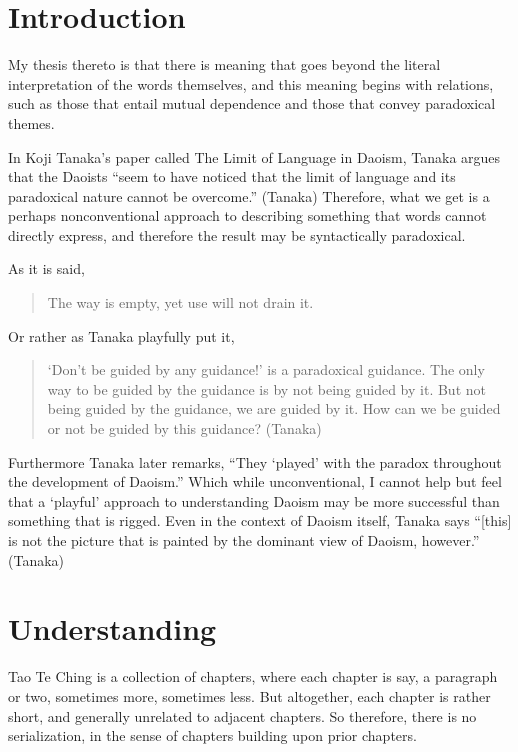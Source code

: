 \section{Introduction}

My thesis thereto is that there is meaning that goes beyond the literal interpretation of the words themselves, and this meaning begins with relations, such as those that entail mutual dependence and those that convey paradoxical themes. 

In Koji Tanaka’s paper called The Limit of Language in Daoism, Tanaka argues that the Daoists “seem to have noticed that the limit of language and its paradoxical nature cannot be overcome.” (Tanaka) Therefore, what we get is a perhaps nonconventional approach to describing something that words cannot directly express, and therefore the result may be syntactically paradoxical.

As it is said,
\begin{quotation}
    The way is empty, yet use will not drain it.
\end{quotation}

Or rather as Tanaka playfully put it, 
\begin{quotation}
‘Don’t be guided by any guidance!’ is a paradoxical guidance. The only way to be guided by the guidance is by not being guided by it. But not being guided by the guidance, we are guided by it. How can we be guided or not be guided by this guidance? (Tanaka)
\end{quotation}

Furthermore Tanaka later remarks, “They ‘played’ with the paradox throughout the development of Daoism.” Which while unconventional, I cannot help but feel that a ‘playful’ approach to understanding Daoism may be more successful than something that is rigged. Even in the context of Daoism itself, Tanaka says “[this] is not the picture that is painted by the dominant view of Daoism, however.” (Tanaka)

\section{Understanding}

Tao Te Ching is a collection of chapters, where each chapter is say, a paragraph or two, sometimes more, sometimes less. But altogether, each chapter is rather short, and generally unrelated to adjacent chapters. So therefore, there is no serialization, in the sense of chapters building upon prior chapters.

